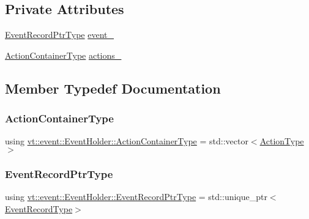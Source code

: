 \subsection*{Private Attributes}
\begin{DoxyCompactItemize}
\item 
\hyperlink{structvt_1_1event_1_1_event_holder_a89949c85549018aad229356105187d50}{Event\+Record\+Ptr\+Type} \hyperlink{structvt_1_1event_1_1_event_holder_a62cebec55c3a8a4a54423d11504fb4ea}{event\+\_\+}
\item 
\hyperlink{structvt_1_1event_1_1_event_holder_ae0e2d5fe3bd5792118116105a0a09db7}{Action\+Container\+Type} \hyperlink{structvt_1_1event_1_1_event_holder_ab2badf41e04556c851639ea432768560}{actions\+\_\+}
\end{DoxyCompactItemize}


\subsection{Member Typedef Documentation}
\mbox{\label{structvt_1_1event_1_1_event_holder_ae0e2d5fe3bd5792118116105a0a09db7}} 
\subsubsection{\texorpdfstring{Action\+Container\+Type}{ActionContainerType}}
{\footnotesize\ttfamily using \hyperlink{structvt_1_1event_1_1_event_holder_ae0e2d5fe3bd5792118116105a0a09db7}{vt\+::event\+::\+Event\+Holder\+::\+Action\+Container\+Type} =  std\+::vector$<$\hyperlink{namespacevt_ae0a5a7b18cc99d7b732cb4d44f46b0f3}{Action\+Type}$>$}

\mbox{\label{structvt_1_1event_1_1_event_holder_a89949c85549018aad229356105187d50}} 
\subsubsection{\texorpdfstring{Event\+Record\+Ptr\+Type}{EventRecordPtrType}}
{\footnotesize\ttfamily using \hyperlink{structvt_1_1event_1_1_event_holder_a89949c85549018aad229356105187d50}{vt\+::event\+::\+Event\+Holder\+::\+Event\+Record\+Ptr\+Type} =  std\+::unique\+\_\+ptr$<$\hyperlink{structvt_1_1event_1_1_event_holder_adfdec23d67b016b1f028694d5ca5bcff}{Event\+Record\+Type}$>$}

